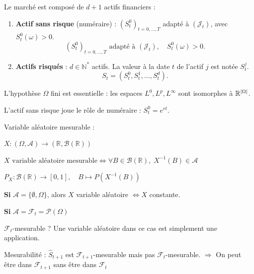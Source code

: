\begin{definition}
Le marché est composé de $d+1$ actifs financiers :
\begin{enumerate}
    \item \textbf{Actif sans risque} (numéraire) : $(S_t^0)_{t=0,\ldots,T}$ adapté à $(\mathcal{J}_t)$, avec $S_t^0(\omega)>0$.
    \begin{equation}
    (S_t^0)_{t=0,\ldots,T} \text{ adapté à } (\mathcal{J}_t), \quad S_t^0(\omega)>0.
    \end{equation}
    
    \item \textbf{Actifs risqués} : $d \in \mathbb{N}^*$ actifs. La valeur à la date $t$ de l'actif $j$ est notée $S_t^j$.
    \begin{equation}
    S_t = (S_t^0, S_t^1, \ldots, S_t^d).
    \end{equation}
\end{enumerate}
\end{definition}

\begin{remarques}
\item L'hypothèse $\Omega$ fini est essentielle : les espaces $L^0,L^p,L^\infty$ sont isomorphes à $\mathbb{R}^{|\Omega|}$.
\item L'actif sans risque joue le rôle de numéraire : $S_t^0 = e^{rt}$.
\item Variable aléatoire mesurable :

$X : (\Omega, \mathcal{A}) \longrightarrow (\mathbb{R}, \mathcal{B}(\mathbb{R}))$

$X \text{ variable aléatoire mesurable} \Longleftrightarrow \forall B \in \mathcal{B}(\mathbb{R}), \; X^{-1}(B) \in \mathcal{A}$

$P_X : \mathcal{B}(\mathbb{R}) \longrightarrow [0,1], \quad B \longmapsto P(X^{-1}(B))$

\vspace{1em}
\textbf{Si } $\mathcal{A} = \{\emptyset, \Omega\}$, 
alors $X$ variable aléatoire $\Longleftrightarrow X$ constante.

\vspace{1em}

\textbf{Si } $\mathcal{A} = \mathcal{F}_t = \mathcal{P}(\Omega)$

 $\mathcal{F}_t$-mesurable ? Une variable aléatoire dans ce cas est simplement une application.

\vspace{1em}
\item Mesurabilité :
$\hat{S}_{t+1}$ est $\mathcal{F}_{t+1}$-mesurable mais pas $\mathcal{F}_t$-mesurable. $\Rightarrow$ On peut être dans $\mathcal{F}_{t+1}$ sans être dans $\mathcal{F}_t$

\end{remarques}

